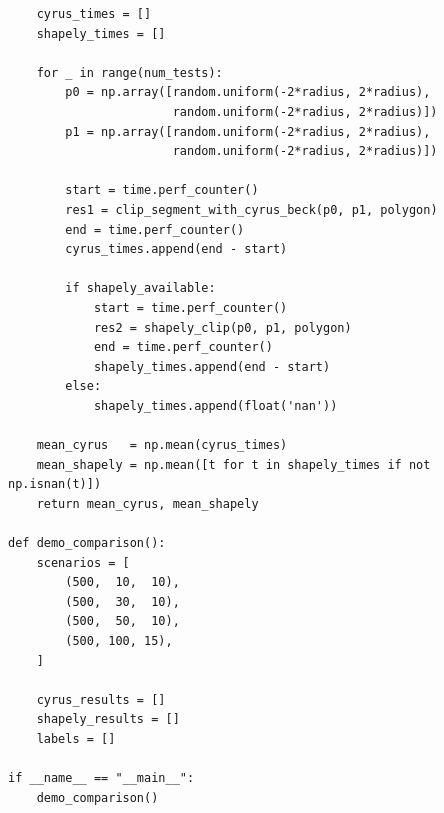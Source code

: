 \documentclass[areasetadvanced]{scrartcl}
\begin{document}
\begin{lstlisting}
    cyrus_times = []
    shapely_times = []
    
    for _ in range(num_tests):
        p0 = np.array([random.uniform(-2*radius, 2*radius),
                       random.uniform(-2*radius, 2*radius)])
        p1 = np.array([random.uniform(-2*radius, 2*radius),
                       random.uniform(-2*radius, 2*radius)])
        
        start = time.perf_counter()
        res1 = clip_segment_with_cyrus_beck(p0, p1, polygon)
        end = time.perf_counter()
        cyrus_times.append(end - start)

        if shapely_available:
            start = time.perf_counter()
            res2 = shapely_clip(p0, p1, polygon)
            end = time.perf_counter()
            shapely_times.append(end - start)
        else:
            shapely_times.append(float('nan'))

    mean_cyrus   = np.mean(cyrus_times)
    mean_shapely = np.mean([t for t in shapely_times if not np.isnan(t)])
    return mean_cyrus, mean_shapely

def demo_comparison():
    scenarios = [
        (500,  10,  10),
        (500,  30,  10),
        (500,  50,  10),
        (500, 100, 15),
    ]
    
    cyrus_results = []
    shapely_results = []
    labels = []

if __name__ == "__main__":
    demo_comparison()

\end{lstlisting}
\end{document}

